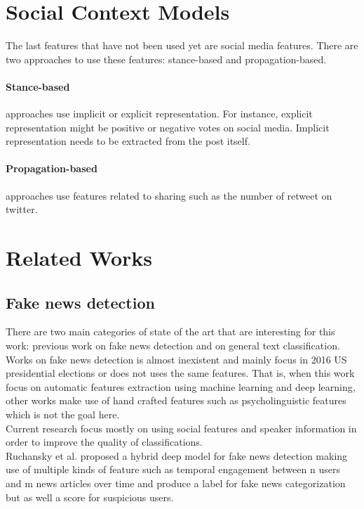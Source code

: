 \section{Social Context Models}
The last features that have not been used yet are social media features. There are two approaches to use these features: stance-based and propagation-based. 

\paragraph{Stance-based} approaches use implicit or explicit representation. For instance, explicit representation might be positive or negative votes on social media. Implicit representation needs to be extracted from the post itself. 

\paragraph{Propagation-based} approaches use features related to sharing such as the number of retweet on twitter. 

\section{Related Works}
\subsection{Fake news detection}

There are two main categories of state of the art that are interesting for this work: previous work on fake news detection and on general text classification. Works on fake news detection is almost inexistent and mainly focus in 2016 US presidential elections or does not uses the same features. That is, when this work focus on automatic features extraction using machine learning and deep learning, other works make use of hand crafted features\cite{Reis2019,Perez-Rosas2017} such as psycholinguistic features\cite{Pennebaker2001} which is not the goal here. \\


Current research focus mostly on using social features and speaker information in order to improve the quality of classifications.\\

Ruchansky et al.\cite{Ruchansky2017} proposed a hybrid deep model for fake news detection making use of multiple kinds of feature such as temporal engagement between n users and m news articles over time and produce a label for fake news categorization but as well a score for suspicious users.\\

